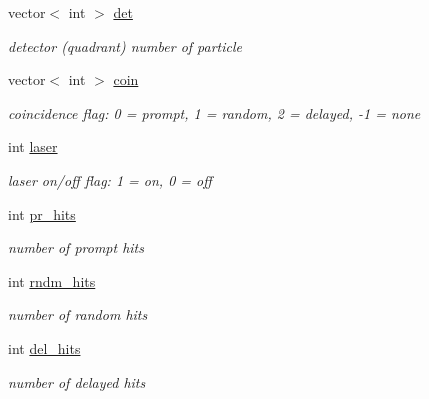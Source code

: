 \begin{DoxyCompactItemize}
\mbox{\label{classg__clx_af736c71de60d093f141cae033d675387}} 
vector$<$ int $>$ \hyperlink{classg__clx_af736c71de60d093f141cae033d675387}{det}
\begin{DoxyCompactList}\small\item\em detector (quadrant) number of particle \end{DoxyCompactList}\item 
\mbox{\label{classg__clx_a8bab7b24f203a20b19f1cbb565d176ad}} 
vector$<$ int $>$ \hyperlink{classg__clx_a8bab7b24f203a20b19f1cbb565d176ad}{coin}
\begin{DoxyCompactList}\small\item\em coincidence flag\+: 0 = prompt, 1 = random, 2 = delayed, -\/1 = none \end{DoxyCompactList}\item 
\mbox{\label{classg__clx_a636dfc5c0302782a3a021dff3f6ec53e}} 
int \hyperlink{classg__clx_a636dfc5c0302782a3a021dff3f6ec53e}{laser}
\begin{DoxyCompactList}\small\item\em laser on/off flag\+: 1 = on, 0 = off \end{DoxyCompactList}\item 
\mbox{\label{classg__clx_ab238ce0805d4af78ff43b999360a28f4}} 
int \hyperlink{classg__clx_ab238ce0805d4af78ff43b999360a28f4}{pr\+\_\+hits}
\begin{DoxyCompactList}\small\item\em number of prompt hits \end{DoxyCompactList}\item 
\mbox{\label{classg__clx_a2ca61cc109e9e0580f35a4baa5ca4b21}} 
int \hyperlink{classg__clx_a2ca61cc109e9e0580f35a4baa5ca4b21}{rndm\+\_\+hits}
\begin{DoxyCompactList}\small\item\em number of random hits \end{DoxyCompactList}\item 
\mbox{\label{classg__clx_a1205d577537a7131563e281be99f4a97}} 
int \hyperlink{classg__clx_a1205d577537a7131563e281be99f4a97}{del\+\_\+hits}
\begin{DoxyCompactList}\small\item\em number of delayed hits \end{DoxyCompactList}\item 

\end{DoxyCompactItemize}
